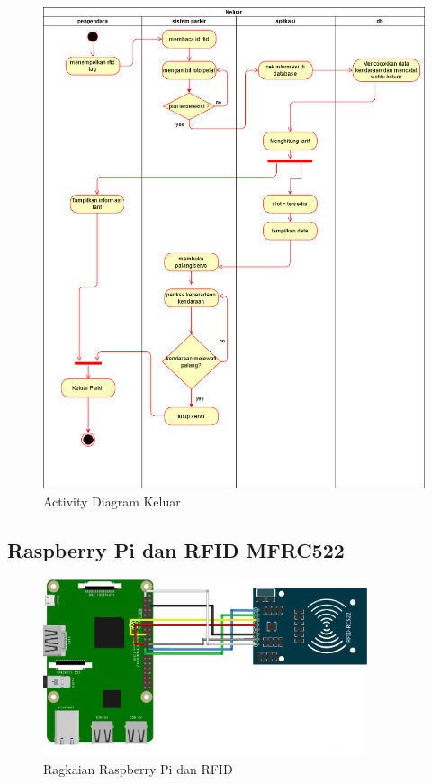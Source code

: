 \begin{figure} [H]
    \includegraphics[width=1\textwidth, center]{images/activity diagram skripsi keluar.png}
    \caption{Activity Diagram Keluar}
    \label{fig:diagramkeluar}
\end{figure}

\subsection{Raspberry Pi dan RFID MFRC522}
\begin{figure} [H]
    \includegraphics[width=0.85\textwidth, center]{images/skematik_rfid.jpg}
    \caption{Ragkaian Raspberry Pi dan RFID}
    \label{fig:skematikRfid}
\end{figure}

